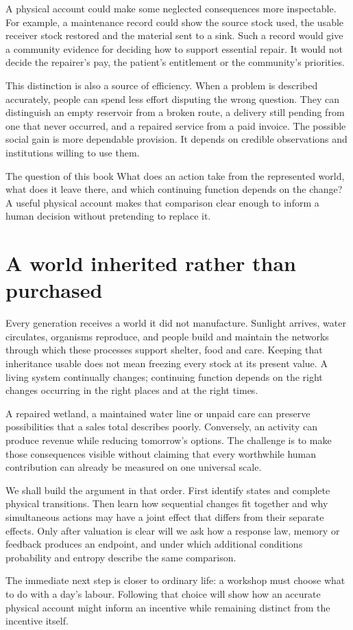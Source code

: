 A physical account could make some neglected consequences more inspectable. For example, a maintenance record could show the source stock used, the usable receiver stock restored and the material sent to a sink. Such a record would give a community evidence for deciding how to support essential repair. It would not decide the repairer's pay, the patient's entitlement or the community's priorities.

This distinction is also a source of efficiency. When a problem is described accurately, people can spend less effort disputing the wrong question. They can distinguish an empty reservoir from a broken route, a delivery still pending from one that never occurred, and a repaired service from a paid invoice. The possible social gain is more dependable provision. It depends on credible observations and institutions willing to use them.

\begin{intuitionbox}{The question of this book}
What does an action take from the represented world, what does it leave there, and which continuing function depends on the change? A useful physical account makes that comparison clear enough to inform a human decision without pretending to replace it.
\end{intuitionbox}

\section{A world inherited rather than purchased}
Every generation receives a world it did not manufacture. Sunlight arrives, water circulates, organisms reproduce, and people build and maintain the networks through which these processes support shelter, food and care. Keeping that inheritance usable does not mean freezing every stock at its present value. A living system continually changes; continuing function depends on the right changes occurring in the right places and at the right times.

A repaired wetland, a maintained water line or unpaid care can preserve possibilities that a sales total describes poorly. Conversely, an activity can produce revenue while reducing tomorrow's options. The challenge is to make those consequences visible without claiming that every worthwhile human contribution can already be measured on one universal scale.

We shall build the argument in that order. First identify states and complete physical transitions. Then learn how sequential changes fit together and why simultaneous actions may have a joint effect that differs from their separate effects. Only after valuation is clear will we ask how a response law, memory or feedback produces an endpoint, and under which additional conditions probability and entropy describe the same comparison.

The immediate next step is closer to ordinary life: a workshop must choose what to do with a day's labour. Following that choice will show how an accurate physical account might inform an incentive while remaining distinct from the incentive itself.
